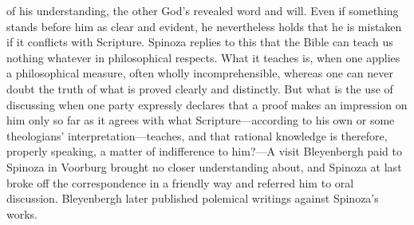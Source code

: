 \documentclass[12pt]{book}
\begin{document}
of his understanding, the other God's revealed word and will. Even if something stands
before him as clear and evident, he nevertheless holds that he is mistaken if it
conflicts with Scripture. Spinoza replies to this that the Bible can teach us nothing
whatever in philosophical respects. What it teaches is, when one applies a philosophical
measure, often wholly incomprehensible, whereas one can never doubt the truth of what
is proved clearly and distinctly. But what is the use of discussing when one party
expressly declares that a proof makes an impression on him only so far as it agrees
with what Scripture---according to his own or some theologians' interpretation---teaches,
and that rational knowledge is therefore, properly speaking, a matter of indifference to
him?---A visit Bleyenbergh paid to Spinoza in Voorburg brought no closer understanding
about, and Spinoza at last broke off the correspondence in a friendly way and referred
him to oral discussion. Bleyenbergh later published polemical writings against
Spinoza's works.
\end{document}
